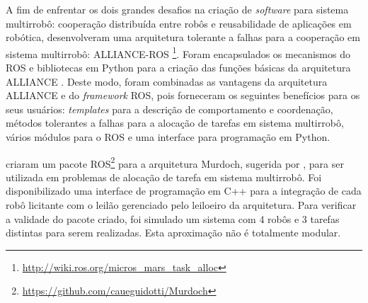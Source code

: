         A fim de enfrentar os dois grandes desafios na criação de \textit{software} para sistema multirrobô: cooperação distribuída entre robôs e reusabilidade de aplicações em robótica,  desenvolveram uma arquitetura tolerante a falhas para a cooperação em sistema multirrobô: ALLIANCE-ROS \footnote{\url{http://wiki.ros.org/micros_mars_task_alloc}}. Foram encapsulados os mecanismos do ROS e bibliotecas em Python para a criação das funções básicas da arquitetura ALLIANCE \cite{ref:parker1998alliance}. Deste modo, foram combinadas as vantagens da arquitetura ALLIANCE e do \textit{framework} ROS, pois forneceram os seguintes benefícios para os seus usuários: \textit{templates} para a descrição de comportamento e coordenação, métodos tolerantes a falhas para a alocação de tarefas em sistema multirrobô, vários módulos para o ROS e uma interface para programação em Python.
        
         criaram um pacote ROS\footnote{\url{https://github.com/caueguidotti/Murdoch}} para a arquitetura Murdoch, sugerida por , para ser utilizada em problemas de alocação de tarefa em sistema multirrobô. Foi disponibilizado uma interface de programação em C++ para a integração de cada robô licitante com o leilão gerenciado pelo leiloeiro da arquitetura. Para verificar a validade do pacote criado, foi simulado um sistema com 4 robôs e 3 tarefas distintas para serem realizadas. Esta aproximação não é totalmente modular.
 
